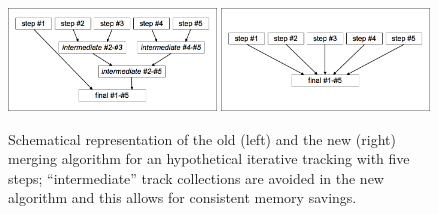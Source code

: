 \begin{figure}[b]
\begin{center}
\includegraphics*[width=0.492\textwidth]{figs/oldMerge.png}
\hskip 0.5mm
\includegraphics*[width=0.492\textwidth]{figs/newMerge.png}
\caption{Schematical representation of the old 
  (left) and the new (right) merging algorithm for an hypothetical
  iterative tracking with five steps; ``intermediate'' track
  collections are avoided in the new
  algorithm and this allows for consistent memory savings.}
\label{fig:merge}
\end{center}
\end{figure}


